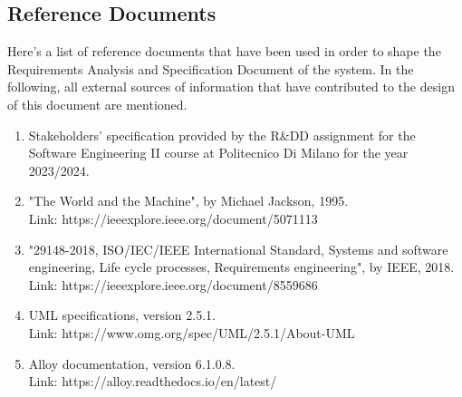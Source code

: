 \subsection{Reference Documents}
Here's a list of reference documents that have been used in order to shape the Requirements Analysis and Specification Document of the \app system. In the following, all external sources of information that have contributed to the design of this document are mentioned.

\begin{enumerate}[]
	\item Stakeholders' specification provided by the R\&DD assignment for the Software Engineering II course at Politecnico Di Milano for the year 2023/2024.
	\item "The World and the Machine", by Michael Jackson, 1995. \\Link: https://ieeexplore.ieee.org/document/5071113
	\item "29148-2018, ISO/IEC/IEEE International Standard, Systems and software engineering, Life cycle processes, Requirements engineering", by IEEE, 2018. \\Link: https://ieeexplore.ieee.org/document/8559686
	\item UML specifications, version 2.5.1. \\Link: https://www.omg.org/spec/UML/2.5.1/About-UML
	\item Alloy documentation, version 6.1.0.8. \\
	Link: https://alloy.readthedocs.io/en/latest/

\end{enumerate}